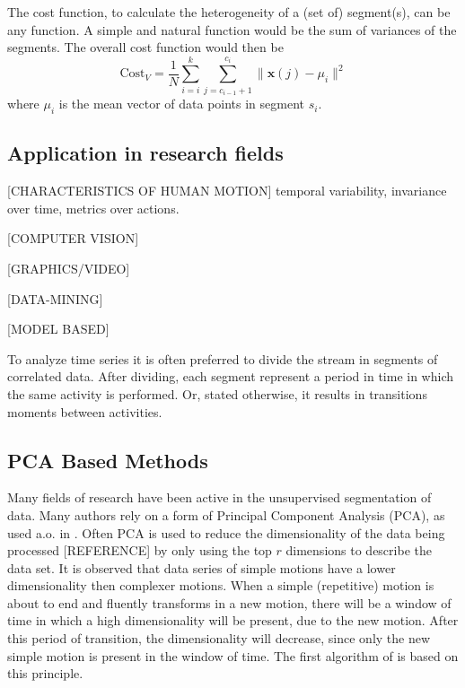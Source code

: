The cost function, to calculate the heterogeneity of a (set of) segment(s),
can
be any function. A simple and natural function would be the sum of variances
of the segments. The overall cost function would then be
\begin{equation} \label{eq:cost_variances}
\mathrm{Cost}_V = \frac{1}{N} \sum_{i=i}^{k} \sum_{j=c_{i-1}+1}^{c_i} \|
\mathbf{x}(j) - \mu_i \|^2
\end{equation}
where $\mu_i$ is the mean vector of data points in segment $s_i$.

\subsection{Application in research fields}

[CHARACTERISTICS OF HUMAN MOTION]
temporal variability, invariance over time, metrics over actions.

[COMPUTER VISION]

[GRAPHICS/VIDEO]

[DATA-MINING]

[MODEL BASED]

To analyze time series it is often preferred to divide the stream in segments
of correlated data. After dividing, each segment represent a period in time in
which the same activity is performed. Or, stated otherwise, it results in
transitions moments between activities.

\subsection{PCA Based Methods}

Many fields of research have been active in the unsupervised segmentation of
data. Many authors rely on a form of Principal Component Analysis (PCA), as
used a.o. in \cite{barbivc2004segmenting}. Often PCA is used to reduce the
dimensionality of the data being processed [REFERENCE] by only using the top
$r$ dimensions to describe the data set. It is observed that data series of
simple motions have a lower dimensionality then complexer motions. When a
simple (repetitive) motion is about to end and fluently transforms in a new
motion, there will be a window of time in which a high dimensionality will be
present, due to the new motion. After this period of transition, the
dimensionality will decrease, since only the new simple motion is present in
the window of time. The first algorithm of \cite{barbivc2004segmenting} is
based on this principle.


